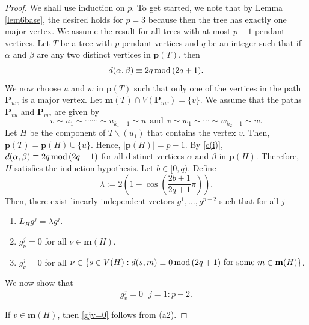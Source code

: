 \documentclass[preprint,12pt]{elsarticle}
\newcommand{\1}{\mathbf{1}}
\newcommand{\0}{\mathbf{0}}
\newcommand{\p}{{\mathbf{P}}}
\def\m{\mathbf{m}}
\def\pt{\mathbf{p}}
\def\p{\mathbf{P}}
\begin{document}
\begin{proof}
We shall use induction on $p$. To get started, we note that by Lemma \ref{lem6base}, the desired holds for $p=3$ 
because then the tree has exactly one major vertex.
We assume the result for all trees with at most $p-1$ pendant vertices. 
Let $T$ be a tree with $p$ pendant vertices and
$q$ be an integer such that if $\alpha$ and $\beta$ are any two distinct vertices
in $\pt(T)$, then
\begin{equation}\label{c(i)}
 d(\alpha,\beta)\equiv 2q\,{\rm{mod}}\,(2q+1).   
\end{equation}
We now choose $u$ and $w$ in $\pt(T)$ such that only one of the vertices in the path $\p_{uw}$
is a major vertex. 
Let \(\m(T) \cap V(\p_{uw})=\{v\}.\)
We assume that the paths  $\p_{vu}$ and $\p_{vw}$ are given by
\[v \sim u_1 \sim \cdots \cdots \sim u_{k_1-1} \sim u ~~\mbox{and}~~
v \sim w_1 \sim \cdots \sim w_{k_2-1} \sim w.\]
Let $H$ be the component of $T\smallsetminus (u_1)$ that
contains the vertex $v$. Then,
$\pt(T)=\pt(H) \cup \{u\}$. 
Hence,
$|\pt(H)|=p-1$.
By \eqref{c(i)},
$d(\alpha,\beta) \equiv 2q\,{\rm{mod}}\,(2q+1)$ for all distinct vertices $\alpha$ and $\beta$ in $\pt(H)$.
Therefore, $H$ satisfies the induction hypothesis. 
Let $b \in [0,q)$. Define
\[\lambda:=2\left(1-\cos\left(\frac{2b+1}{2q+1} \pi\right) \right).
\]
Then, there exist linearly independent vectors $g^1,\dotsc,g^{p-2}$ such that for all $j$
 \begin{enumerate}
     \item[{\rm (a1)}] $L_Hg^j=\lambda g^j$.
     \item[\rm (a2)] $g^j_{\nu}=0$ for all $\nu \in \m(H)$.
     \item[\rm (a3)] $g^j_{\nu}=0$ for all $\nu \in \{s \in V(H):d(s,m) \equiv 0\,{\rm{mod}}\,(2q+1)~\mbox{for some}~m \in \m(H)\}$.
 \end{enumerate}
 We now show that
\begin{equation} \label{gjv=0}
g^j_v=0~~~j=1:p-2.
\end{equation}

If $v \in \m(H)$, then \eqref{gjv=0} follows from (a2).


\end{proof}
\end{document}
